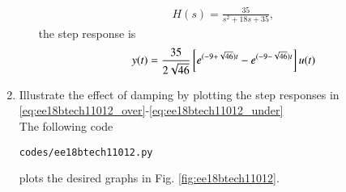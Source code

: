 \begin{enumerate}[label=\thesubsection.\arabic*.,ref=\thesubsection.\theenumi]
\begin{enumerate}
\begin{align}
H(s)=\frac{35}{s^2+18s+35},
\end{align}
the step response is
\begin{equation}
    y(t)=\frac{35}{2\sqrt{46}}{}\left[e^{(-9+\sqrt{46})t}-e^{(-9-\sqrt{46})t}\right]u(t)
\label{eq:ee18btech11012_under}
\end{equation}
\end{enumerate}
\item Illustrate the effect of damping by plotting the step responses in \eqref{eq:ee18btech11012_over}-\eqref{eq:ee18btech11012_under}
\\
\solution The following code
\begin{lstlisting}
codes/ee18btech11012.py
\end{lstlisting}
%
plots the desired graphs in
Fig.     \ref{fig:ee18btech11012}. 
%

\end{enumerate}
